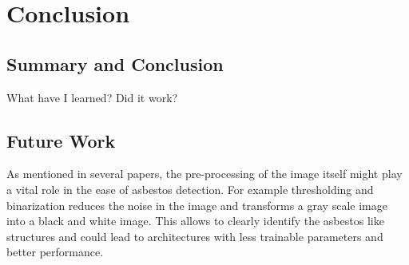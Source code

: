 \chapter{Conclusion}

\section{Summary and Conclusion}

What have I learned? Did it work?

\section{Future Work}

As mentioned in several papers, the pre-processing of the image itself might play a vital role in the ease of asbestos detection. For example thresholding and binarization reduces the noise in the image and transforms a gray scale image into a black and white image. This allows to clearly identify the asbestos like structures and could lead to architectures with less trainable parameters and better performance.